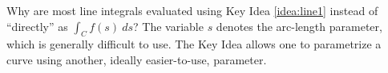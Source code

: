 {Why are most line integrals evaluated using Key Idea \ref{idea:line1} instead of ``directly'' as $\int_C f(s)\ ds$?
}
{The variable $s$ denotes the arc-length parameter, which is generally difficult to use. The Key Idea allows one to parametrize a curve using another, ideally easier-to-use, parameter.
}
